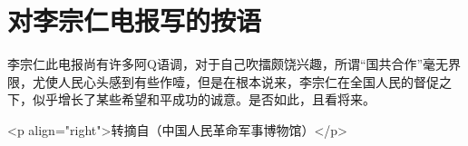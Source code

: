 \section[对李宗仁电报写的按语（一九四九年三月）]{对李宗仁电报写的按语}


李宗仁此电报尚有许多阿Q语调，对于自己吹擂颇饶兴趣，所谓“国共合作”毫无界限，尤使人民心头感到有些作噎，但是在根本说来，李宗仁在全国人民的督促之下，似乎增长了某些希望和平成功的诚意。是否如此，且看将来。

<p align="right">转摘自（中国人民革命军事博物馆）</p>

